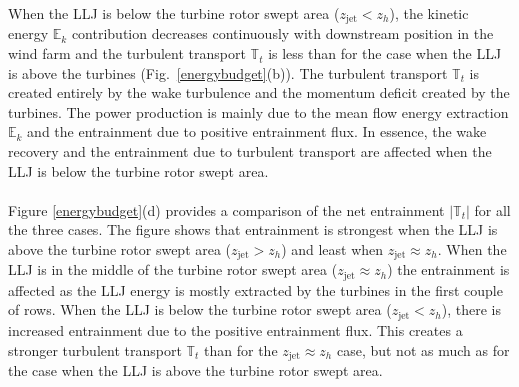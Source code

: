 \documentclass[%
 aip,
 amsmath,amssymb,
reprint,
twocolumn,%
author-numerical,%
]{revtex4-1}
\begin{document}
{{{\color{black} When the LLJ is below the turbine rotor swept area ($z_\text{jet} < z_h$), the kinetic energy $\mathbb{E}_k$ contribution decreases continuously with downstream position in the wind farm and the turbulent transport $\mathbb{T}_t$ is less than for the case when the LLJ is above the turbines (Fig.\ \ref{energybudget}(b)).} The turbulent transport $\mathbb{T}_t$ is created entirely by the wake turbulence and the momentum deficit created by the turbines. The power production is mainly due to the mean flow energy extraction $\mathbb{E}_k$ and the entrainment due to positive entrainment flux. {\color{black}In essence, the wake recovery and the entrainment due to turbulent transport are affected when the LLJ is below the turbine rotor swept area.}\\
\\
\indent Figure \ref{energybudget}(d) provides a comparison of the net entrainment $|\mathbb{T}_t|$ for all the three cases. {\color{black} The figure shows that entrainment is strongest when the LLJ is above the turbine rotor swept area ($z_\text{jet} > z_h$) and least when $z_\text{jet} \approx z_h$}. {\color{black} When the LLJ is in the middle of the turbine rotor swept area ($z_\text{jet} \approx z_h$) the entrainment is affected as the LLJ energy is mostly extracted by the turbines in the first couple of rows. When the LLJ is below the turbine rotor swept area ($z_\text{jet} < z_h$), there is increased entrainment due to the positive entrainment flux. This creates a stronger turbulent transport $\mathbb{T}_t$ than for the $z_\text{jet} \approx z_h$ case, but not as much as for the case when the LLJ is above the turbine rotor swept area.}

}}
\end{document}
